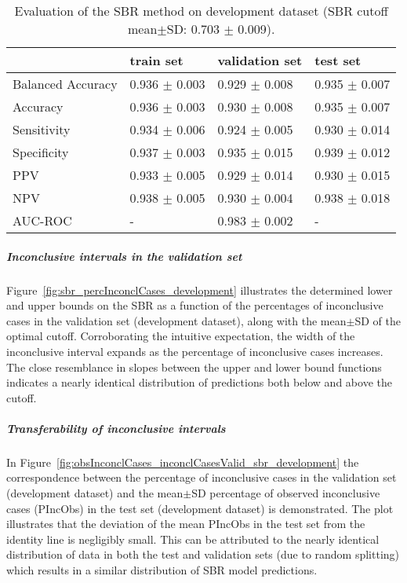 \begin{table}[ht]
  \caption{Evaluation of the SBR method on development dataset (SBR cutoff mean$\pm$SD: 0.703 $\pm$ 0.009).}
  \centering
  \begin{tabular}{llll}
      \hline
                        & train set         & validation set      & test set             \\
      \hline
      Balanced Accuracy & 0.936 $\pm$ 0.003   &   0.929 $\pm$ 0.008   &  0.935 $\pm$ 0.007     \\
      Accuracy          & 0.936 $\pm$ 0.003   &   0.930 $\pm$ 0.008   &  0.935 $\pm$ 0.007     \\
      Sensitivity       &  0.934 $\pm$ 0.006  &   0.924 $\pm$ 0.005   &  0.930 $\pm$ 0.014     \\
      Specificity       & 0.937 $\pm$ 0.003   &   0.935 $\pm$ 0.015   &  0.939 $\pm$ 0.012     \\
      PPV               &  0.933 $\pm$ 0.005  &   0.929 $\pm$ 0.014   &  0.930 $\pm$ 0.015     \\
      NPV               &  0.938 $\pm$ 0.005  &   0.930 $\pm$ 0.004   &  0.938 $\pm$ 0.018     \\
      \hline
      AUC-ROC          &         -           & 0.983 $\pm$ 0.002     & -  \\
      \hline
  \end{tabular}
 \label{t1:sbr_perf_eval_table}
\end{table}

\subparagraph{Inconclusive intervals in the validation set}

Figure~\ref{fig:sbr_percInconclCases_development} illustrates the determined lower and upper bounds on the SBR 
as a function of the percentages of inconclusive cases in the validation set (development dataset), 
along with the mean$\pm$SD of the optimal cutoff.
Corroborating the intuitive expectation, the width of the inconclusive interval expands 
as the percentage of inconclusive cases increases.
The close resemblance in slopes between the upper and lower bound functions 
indicates a nearly identical distribution of predictions both below and above the cutoff.

\subparagraph{Transferability of inconclusive intervals}

In Figure~\ref{fig:obsInconclCases_inconclCasesValid_sbr_development} the correspondence between 
the percentage of inconclusive cases in the validation set (development dataset) and 
the mean$\pm$SD percentage of observed inconclusive cases (PIncObs) in the test set (development dataset) is demonstrated.
The plot illustrates that the deviation of the mean PIncObs in the test set from the 
identity line is negligibly small.
This can be attributed to the nearly identical distribution of data in both the test and validation sets 
(due to random splitting) which results in a similar distribution of SBR model predictions.


